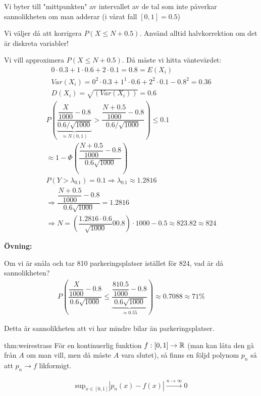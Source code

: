 \noindent Vi byter till "mittpunkten" av intervallet av de tal som inte påverkar sannolikheten om man adderar (i vårat fall $[0,1] = 0.5$)\par
\noindent Vi väljer då att korrigera $P(X\leq N+0.5)$. Använd alltid halvkorrektion om det är diskreta variabler!
\par\bigskip
\noindent Vi vill approximera $P(X\leq N+0.5)$. Då måste vi hitta väntevärdet:
\begin{equation*}
  \begin{gathered}
    0\cdot0.3+1\cdot0.6+2\cdot0.1 = 0.8 = E(X_i)\\
    Var(X_i) = 0^2\cdot0.3+1^1\cdot0.6+2^2\cdot0.1-0.8^2 = 0.36\\
    D(X_i) = \sqrt{(Var(X_i))} = 0.6
  \end{gathered}
\end{equation*}
\begin{equation*}
  \begin{gathered}
    P\left(\underbrace{\dfrac{\dfrac{X}{1000}-0.8}{0.6/\sqrt{1000}}}_{\text{$\approx N(0,1)$}}> \dfrac{\dfrac{N+0.5}{1000}-0.8}{0.6/\sqrt{1000}}\right)\leq0.1\\
    \approx 1-\Phi\left(\dfrac{\dfrac{N+0.5}{1000}-0.8}{0.6\sqrt{1000}}\right)\\
    P(Y>\lambda_{0.1}) = 0.1\Rightarrow \lambda_{0.1}\approx 1.2816\\
    \Rightarrow \dfrac{\dfrac{N+0.5}{1000}-0.8}{0.6\sqrt{1000}} = 1.2816\\
    \Rightarrow N = \left(\dfrac{1.2816\cdot0.6}{\sqrt{1000}}00.8\right)\cdot1000-0.5 \approx 823.82\approx 824
  \end{gathered}
\end{equation*}
\par\bigskip
\noindent\textbf{Övning:}\par
\noindent Om vi är snåla och tar 810 parkeringsplatser istället för 824, vad är då sannolikheten?
\begin{equation*}
  \begin{gathered}
    P\left(\dfrac{\dfrac{X}{1000}-0.8}{0.6\sqrt{1000}}\leq \underbrace{\dfrac{\dfrac{810.5}{1000}-0.8}{0.6\sqrt{1000}}}_{\text{$\approx 0.55$}}\right) \approx 0.7088\approx 71\%
  \end{gathered}
\end{equation*}\par
\noindent Detta är sannolikheten att vi har mindre bilar än parkeringsplatser.
\newpage
\begin{theo}{thm:weirestrass}
  För en kontinuerlig funktion $f:[0,1]\to\mathbb{R}$ (man kan låta den gå från $A$ om man vill, men då måste $A$ vara slutet), så finns en följd polynom $p_n$ så att $p_n\to f$ likformigt. \par
  \begin{equation*}
    \begin{gathered}
      \text{sup}_{x\in[0,1]}\left|p_n(x)-f(x)\right|\stackrel{n\to\infty}{\rightarrow}0
    \end{gathered}
  \end{equation*}
\end{theo}
